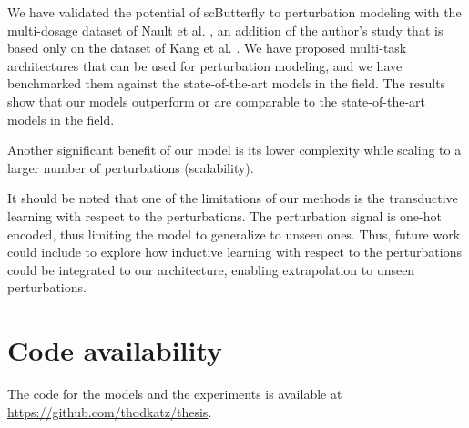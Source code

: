 \documentclass[12pt, a4paper]{article}
\begin{document}


We have validated the potential of scButterfly to perturbation modeling with the multi-dosage dataset of Nault et al. \cite{nault2021single,nault2022benchmarking}, an addition of the author's study that is based only on the dataset of Kang et al. \cite{kanaGenerativeModelingSinglecell2023}. We have proposed multi-task architectures that can be used for perturbation modeling, and we have benchmarked them against the state-of-the-art models in the field. The results show that our models outperform or are comparable to the state-of-the-art models in the field.

Another significant benefit of our model is its lower complexity while scaling to a larger number of perturbations (scalability)\cite{allenspachNeuralMultitaskLearning2024}.

It should be noted that one of the limitations of our methods is the transductive learning with respect to the perturbations. The perturbation signal is one-hot encoded, thus limiting the model to generalize to unseen ones. Thus, future work could include to explore how inductive learning with respect to the perturbations could be integrated to our architecture, enabling extrapolation to unseen perturbations.

\section{Code availability}

The code for the models and the experiments is available at \url{https://github.com/thodkatz/thesis}.

\clearpage


%




\appendix
\end{document}
